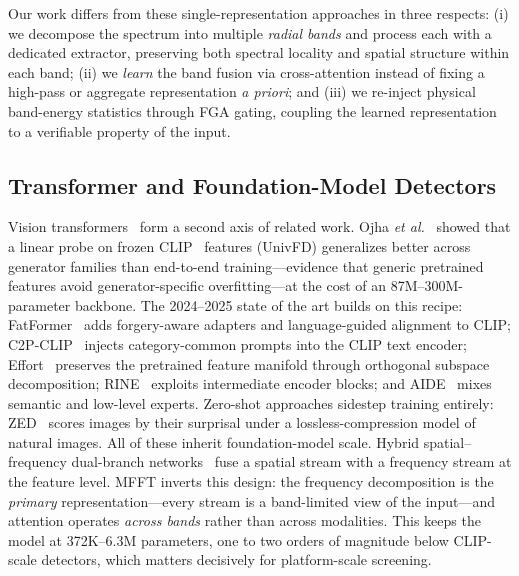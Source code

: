 \documentclass[journal]{IEEEtran}
\begin{document}
Our work differs from these single-representation approaches in three respects: (i) we decompose the spectrum into multiple \emph{radial bands} and process each with a dedicated extractor, preserving both spectral locality and spatial structure within each band; (ii) we \emph{learn} the band fusion via cross-attention instead of fixing a high-pass or aggregate representation \textit{a priori}; and (iii) we re-inject physical band-energy statistics through FGA gating, coupling the learned representation to a verifiable property of the input.

\subsection{Transformer and Foundation-Model Detectors}
Vision transformers~\cite{dosovitskiy2021,touvron2021,liu2021} form a second axis of related work. Ojha \textit{et al.}~\cite{ojha2023} showed that a linear probe on frozen CLIP~\cite{radford2021} features (UnivFD) generalizes better across generator families than end-to-end training---evidence that generic pretrained features avoid generator-specific overfitting---at the cost of an 87M--300M-parameter backbone. The 2024--2025 state of the art builds on this recipe: FatFormer~\cite{liu2024fatformer} adds forgery-aware adapters and language-guided alignment to CLIP; C2P-CLIP~\cite{tan2025c2pclip} injects category-common prompts into the CLIP text encoder; Effort~\cite{yan2025effort} preserves the pretrained feature manifold through orthogonal subspace decomposition; RINE~\cite{koutlis2024rine} exploits intermediate encoder blocks; and AIDE~\cite{yan2025sanity} mixes semantic and low-level experts. Zero-shot approaches sidestep training entirely: ZED~\cite{cozzolino2024zed} scores images by their surprisal under a lossless-compression model of natural images. All of these inherit foundation-model scale. Hybrid spatial--frequency dual-branch networks~\cite{miao2023hierarchical,yan2026dualfreq} fuse a spatial stream with a frequency stream at the feature level. MFFT inverts this design: the frequency decomposition is the \emph{primary} representation---every stream is a band-limited view of the input---and attention operates \emph{across bands} rather than across modalities. This keeps the model at 372K--6.3M parameters, one to two orders of magnitude below CLIP-scale detectors, which matters decisively for platform-scale screening.
\end{document}
